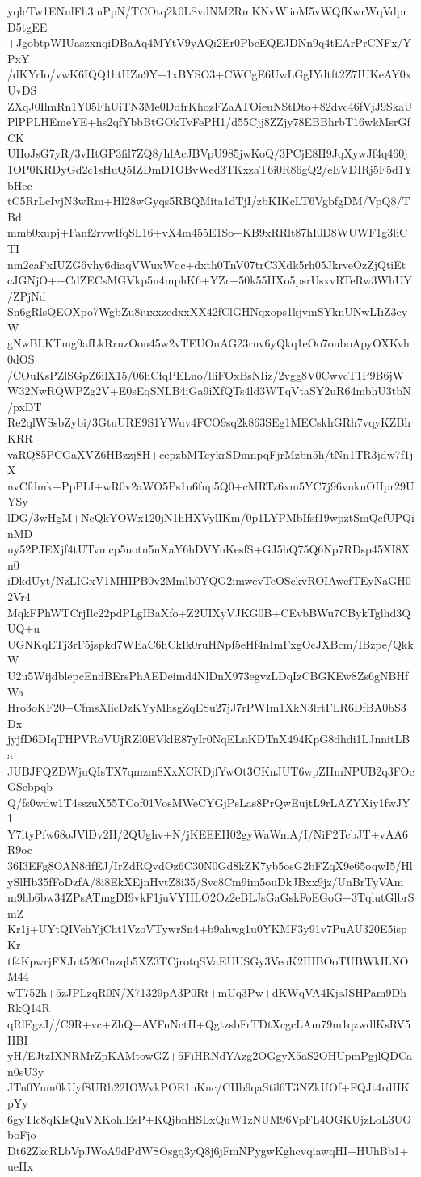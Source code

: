 yqlcTw1ENnlFh3mPpN/TCOtq2k0LSvdNM2RmKNvWlioM5vWQfKwrWqVdprD5tgEE
+JgobtpWIUaszxnqiDBaAq4MYtV9yAQi2Er0PbcEQEJDNn9q4tEArPrCNFx/YPxY
/dKYrIo/vwK6IQQ1htHZu9Y+1xBYSO3+CWCgE6UwLGgIYdtft2Z7IUKeAY0xUvDS
ZXqJ0IlmRn1Y05FhUiTN3Me0DdfrKhozFZaATOieuNStDto+82dvc46fVjJ9SkaU
PlPPLHEmeYE+hs2qfYbbBtGOkTvFePH1/d55Cjj8ZZjy78EBBhrbT16wkMsrGfCK
UHoJsG7yR/3vHtGP3fil7ZQ8/hlAcJBVpU985jwKoQ/3PCjE8H9JqXywJf4q460j
1OP0KRDyGd2c1sHuQ5IZDmD1OBvWed3TKxzaT6i0R86gQ2/eEVDIRj5F5d1YbHcc
tC5RrLcIvjN3wRm+Hl28wGyqs5RBQMita1dTjI/zbKIKcLT6VgbfgDM/VpQ8/TBd
mmb0xupj+Fanf2rvwIfqSL16+vX4m455E1So+KB9xRRlt87hI0D8WUWF1g3liCTI
nm2caFxIUZG6vhy6diaqVWuxWqc+dxth0TnV07trC3Xdk5rh05JkrveOzZjQtiEt
cJGNjO++CdZECsMGVkp5n4mphK6+YZr+50k55HXo5psrUsxvRTeRw3WhUY/ZPjNd
Sn6gRlsQEOXpo7WgbZu8iuxxzedxxXX42fClGHNqxops1kjvmSYknUNwLIiZ3eyW
gNwBLKTmg9afLkRruzOou45w2vTEUOnAG23rnv6yQkq1eOo7ouboApyOXKvh0dOS
/COuKsPZlSGpZ6ilX15/06hCfqPELno/lliFOxBsNIiz/2vgg8V0CwvcT1P9B6jW
W32NwRQWPZg2V+E0sEqSNLB4iGa9iXfQTs4ld3WTqVtaSY2uR64mbhU3tbN/pxDT
Re2qlWSsbZybi/3GtuURE9S1YWuv4FCO9sq2k863SEg1MECskhGRh7vqyKZBhKRR
vaRQ85PCGaXVZ6HBzzj8H+cepzbMTeykrSDmnpqFjrMzbn5h/tNn1TR3jdw7f1jX
nvCfdmk+PpPLI+wR0v2aWO5Ps1u6fnp5Q0+cMRTz6xm5YC7j96vnkuOHpr29UYSy
lDG/3wHgM+NcQkYOWx120jN1hHXVylIKm/0p1LYPMbIfsf19wpztSmQcfUPQinMD
uy52PJEXjf4tUTvmcp5uotn5nXaY6hDVYnKesfS+GJ5hQ75Q6Np7RDsp45XI8Xn0
iDkdUyt/NzLIGxV1MHIPB0v2Mmlb0YQG2imwevTeOSckvROIAwefTEyNaGH02Vr4
MqkFPhWTCrjIlc22pdPLgIBaXfo+Z2UIXyVJKG0B+CEvbBWu7CBykTglhd3QUQ+u
UGNKqETj3rF5jspkd7WEaC6hCkIk0ruHNpf5eHf4nImFxgOcJXBcm/IBzpe/QkkW
U2u5WijdblepcEndBErsPhAEDeimd4NlDnX973egvzLDqIzCBGKEw8Zs6gNBHfWa
Hro3oKF20+CfmsXlicDzKYyMhsgZqESu27jJ7rPWIm1XkN3lrtFLR6DfBA0bS3Dx
jyjfD6DIqTHPVRoVUjRZl0EVklE87yIr0NqELnKDTnX494KpG8dhdi1LJnnitLBa
JUBJFQZDWjuQIsTX7qmzm8XxXCKDjfYwOt3CKnJUT6wpZHmNPUB2q3FOcGScbpqb
Q/fs0wdw1T4sszuX55TCof01VosMWeCYGjPsLas8PrQwEujtL9rLAZYXiy1fwJY1
Y7ltyPfw68oJVlDv2H/2QUghv+N/jKEEEH02gyWaWmA/I/NiF2TcbJT+vAA6R9oc
36I3EFg8OAN8dfEJ/IrZdRQvdOz6C30N0Gd8kZK7yb5osG2bFZqX9e65oqwI5/Hl
ySlHb35fFoDzfA/8i8EkXEjnHvtZ8i35/Svc8Cm9im5ouDkJBxx9jz/UnBrTyVAm
m9hb6bw34ZPsATmgDI9vkF1juVYHLO2Oz2eBLJsGaGskFoEGoG+3TqlutGlbrSmZ
Kr1j+UYtQIVchYjCht1VzoVTywrSn4+b9ahwg1u0YKMF3y91v7PuAU320E5ispKr
tf4KpwrjFXJnt526Cnzqb5XZ3TCjrotqSVaEUUSGy3VeoK2IHBOoTUBWkILXOM44
wT752h+5zJPLzqR0N/X71329pA3P0Rt+mUq3Pw+dKWqVA4KjsJSHPam9DhRkQ14R
qRlEgzJ//C9R+vc+ZhQ+AVFnNctH+QgtzsbFrTDtXcgcLAm79m1qzwdlKsRV5HBI
yH/EJtzIXNRMrZpKAMtowGZ+5FiHRNdYAzg2OGgyX5aS2OHUpmPgjlQDCan0sU3y
JTn0Ynm0kUyf8URh22IOWvkPOE1nKnc/CHb9qaStil6T3NZkUOf+FQJt4rdHKpYy
6gyTlc8qKIsQuVXKohlEsP+KQjbnHSLxQuW1zNUM96VpFL4OGKUjzLoL3UOboFjo
Dt62ZkcRLbVpJWoA9dPdWSOsgq3yQ8j6jFmNPygwKghcvqiawqHI+HUhBb1+ueHx
